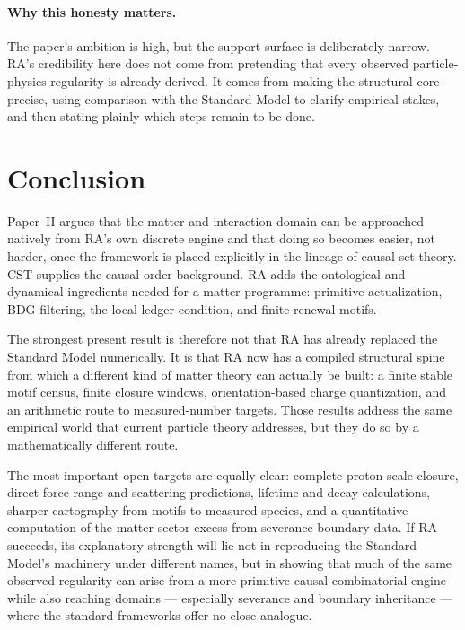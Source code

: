 \documentclass[11pt]{article}
\begin{document}
\paragraph{Why this honesty matters.} The paper's ambition is high, but the support surface is deliberately narrow. RA's credibility here does not come from pretending that every observed particle-physics regularity is already derived. It comes from making the structural core precise, using comparison with the Standard Model to clarify empirical stakes, and then stating plainly which steps remain to be done.

\section{Conclusion}

Paper~II argues that the matter-and-interaction domain can be approached natively from RA's own discrete engine and that doing so becomes easier, not harder, once the framework is placed explicitly in the lineage of causal set theory. CST supplies the causal-order background. RA adds the ontological and dynamical ingredients needed for a matter programme: primitive actualization, BDG filtering, the local ledger condition, and finite renewal motifs.

The strongest present result is therefore not that RA has already replaced the Standard Model numerically. It is that RA now has a compiled structural spine from which a different kind of matter theory can actually be built: a finite stable motif census, finite closure windows, orientation-based charge quantization, and an arithmetic route to measured-number targets. Those results address the same empirical world that current particle theory addresses, but they do so by a mathematically different route.

The most important open targets are equally clear: complete proton-scale closure, direct force-range and scattering predictions, lifetime and decay calculations, sharper cartography from motifs to measured species, and a quantitative computation of the matter-sector excess from severance boundary data. If RA succeeds, its explanatory strength will lie not in reproducing the Standard Model's machinery under different names, but in showing that much of the same observed regularity can arise from a more primitive causal-combinatorial engine while also reaching domains --- especially severance and boundary inheritance --- where the standard frameworks offer no close analogue.
\end{document}
